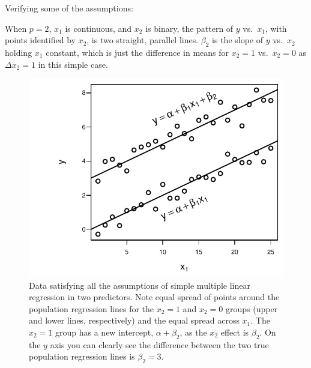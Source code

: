 Verifying some of the assumptions:
\be
\item   When $p=2$, $x_{1}$ is continuous, and $x_{2}$ is binary, the
        pattern of $y$ vs.\ $x_{1}$, with points identified by
        $x_{2}$, is two straight, parallel lines.  $\beta_{2}$ is the
        slope of $y$ vs.\ $x_{2}$ holding $x_{1}$ constant, which is
        just the difference in means for $x_{2}=1$ vs.\ $x_{2}=0$ as
        $\Delta x_{2}=1$ in this simple case.
\begin{Schunk}
\begin{figure}[htbp]

\centerline{\includegraphics{reg-mult-reg-assume-twovar-1} }

\caption[Assumptions for two predictors]{Data satisfying all the assumptions of simple multiple linear regression in two predictors.  Note equal spread of points around the population regression lines for the $x_{2}=1$ and $x_{2}=0$ groups (upper and lower lines, respectively) and the equal spread across $x_1$.  The $x_{2}=1$ group has a new intercept, $\alpha+\beta_2$, as the $x_2$ effect is $\beta_2$.  On the $y$ axis you can clearly see the difference between the two true population regression lines is $\beta_{2} = 3$.}\label{fig:reg-mult-reg-assume-twovar}
\end{figure}
\end{Schunk}
